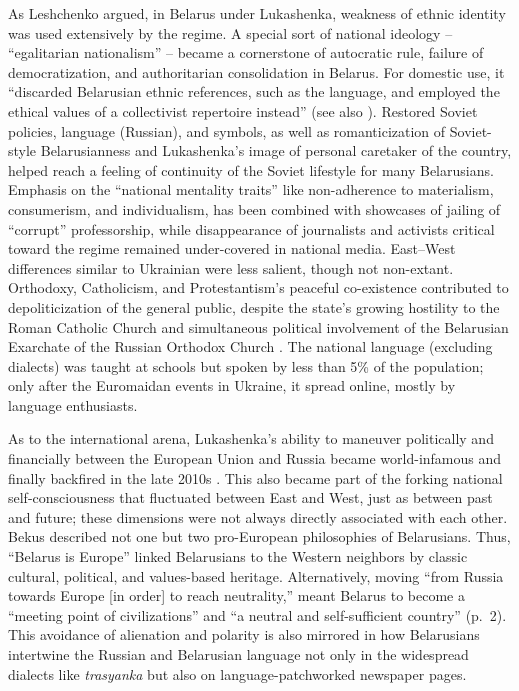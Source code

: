 As Leshchenko \cite{Leshchenko2008} argued, in Belarus under Lukashenka, weakness of ethnic identity was used extensively by the regime. A special sort of national ideology -- “egalitarian nationalism” -- became a cornerstone of autocratic rule, failure of democratization, and authoritarian consolidation in Belarus. For domestic use, it “discarded Belarusian ethnic references, such as the language, and employed the ethical values of a collectivist repertoire instead” \cite[p.~1420]{Leshchenko2008} (see also \cite{Kazharski}). Restored Soviet policies, language (Russian), and symbols, as well as romanticization of Soviet-style Belarusianness \cite{Gapova} and Lukashenka’s image of personal caretaker of the country, helped reach a feeling of continuity of the Soviet lifestyle for many Belarusians. Emphasis on the “national mentality traits” like non-adherence to materialism, consumerism, and individualism, has been combined with showcases of jailing of “corrupt” professorship, while disappearance of journalists and activists critical toward the regime remained under-covered in national media. East–West differences similar to Ukrainian were less salient, though not non-extant. Orthodoxy, Catholicism, and Protestantism’s peaceful co-existence contributed to depoliticization of the general public, despite the state’s growing hostility to the Roman Catholic Church and simultaneous political involvement of the Belarusian Exarchate of the Russian Orthodox Church \cite{Vasilevich}. The national language (excluding dialects) was taught at schools but spoken by less than 5\% of the population; only after the Euromaidan events in Ukraine, it spread online, mostly by language enthusiasts.

As to the international arena, Lukashenka’s ability to maneuver politically and financially between the European Union and Russia became world-infamous and finally backfired in the late 2010s \cite{Nizhnikau}. This also became part of the forking national self-consciousness that fluctuated between East and West, just as between past and future; these dimensions were not always directly associated with each other. Bekus \cite{Bekus} described not one but two pro-European philosophies of Belarusians. Thus, “Belarus is Europe” linked Belarusians to the Western neighbors by classic cultural, political, and values-based heritage. Alternatively, moving “from Russia towards Europe [in order] to reach neutrality,” meant Belarus to become a “meeting point of civilizations” and “a neutral and self-sufficient country” (p.~2). This avoidance of alienation and polarity is also mirrored in how Belarusians intertwine the Russian and Belarusian language \cite{Bekus2014} not only in the widespread dialects like \textit{trasyanka} but also on language-patchworked newspaper pages.

